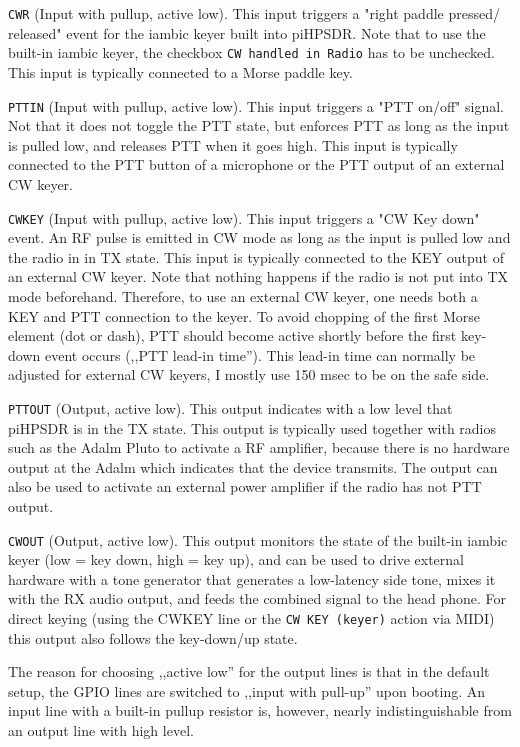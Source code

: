 \documentclass[12pt]{book}
\def\rett#1{\texttt{\color{red}#1}}
\def\bltt#1{\texttt{\color{blue}#1}}
\begin{document}
\rett{CWR} (Input with pullup, active low). This input triggers a "right paddle pressed/
released" event for the
iambic keyer built into piHPSDR. Note that to use the built-in iambic keyer, the checkbox 
\bltt{CW handled in Radio} has to be unchecked. This input is typically connected to
a Morse paddle key.


\rett{PTTIN} (Input with pullup, active low). This input triggers a "PTT on/off" signal.
Not that it does not toggle the PTT state, but enforces PTT as long as the input is pulled low,
and releases PTT when it goes high. This input is typically connected to the PTT button of
a microphone or the PTT output of an external CW keyer.

\rett{CWKEY} (Input with pullup, active low). This input triggers a "CW Key down" event. An
RF pulse is emitted in CW mode as long as the input is pulled low and the radio in in TX state.
This input is typically connected to the KEY output of an external CW keyer.  Note that  nothing
happens if the radio is not put into TX mode beforehand. Therefore, to use an external CW keyer,
one needs both a KEY and PTT connection to the keyer. To avoid chopping of the first Morse element
(dot or dash), PTT should become active shortly before the first key-down event occurs (,,PTT
lead-in time''). This lead-in time can normally be adjusted for external CW keyers, I mostly use
150 msec to be on the safe side.

\rett{PTTOUT} (Output, active low). This output indicates with a low level that piHPSDR is in the
TX state. This output is typically used together with radios such as the Adalm Pluto to activate
a RF amplifier, because there is no hardware output at the Adalm which indicates that the device
transmits. The output can also be used to activate an external power amplifier if the radio has
not PTT output.

\rett{CWOUT} (Output, active low). This output monitors the state of the built-in iambic keyer
(low = key down, high = key up), and can be used to drive external hardware with a tone generator
that generates a low-latency side tone, mixes it with the RX audio output, and feeds the combined
signal to the head phone. For direct keying (using the CWKEY line or the \bltt{CW KEY (keyer)}
action via MIDI) this output also
follows the key-down/up state.

The reason for choosing ,,active low'' for the output lines is that in the default setup,
the GPIO lines are switched
to ,,input with pull-up'' upon booting. An input line with a built-in pullup
resistor is, however, 
nearly indistinguishable from an output line with high level.
\end{document}
